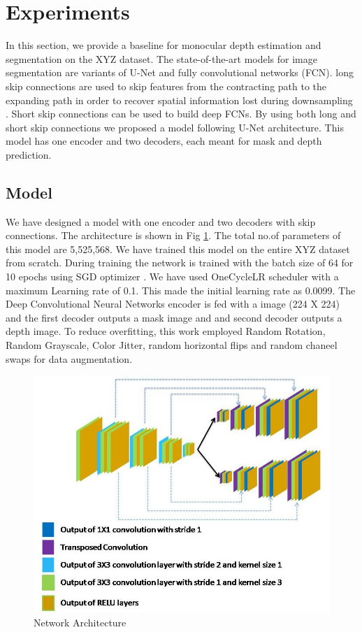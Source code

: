 \documentclass{article}
\begin{document}
\section{Experiments}
In this section, we provide a baseline for monocular depth estimation and segmentation on the XYZ dataset. 
The state-of-the-art models for image segmentation are variants of U-Net and fully convolutional networks (FCN)\cite{drozdzal2016importance}. 
long skip connections are used to skip features from the contracting path to the expanding path in order to recover 
spatial information lost during downsampling \cite{zhou2019unet++}. Short skip connections can be used to build deep FCNs. 
By using both long and short skip connections we proposed a model following U-Net architecture. 
This model has one encoder and two decoders, each meant for mask and depth prediction.
\subsection{Model}
We have designed a model with one encoder and two decoders with skip connections. 
The architecture is shown in Fig \ref{fig:modelarch}. The total no.of parameters of this model are 5,525,568. 
We have trained this model on the entire XYZ dataset from scratch. 
During training the network is trained with the batch size of 64 for 10 epochs using SGD optimizer \cite{bottou2010large}. 
We have used OneCycleLR scheduler \cite{smith2018disciplined} with a maximum Learning rate of 0.1. 
This made the initial learning rate as 0.0099.
The Deep Convolutional Neural Networks encoder is fed with a image (224 X 224) and the first decoder outputs a mask 
image and and second decoder outputs a depth image. To reduce overfitting\cite{perez2017effectiveness}, 
this work employed Random Rotation, Random Grayscale, Color Jitter, random horizontal flips and random chaneel swaps for data augmentation.

\begin{figure}[h!]
\centering
  \includegraphics[width=1\textwidth]{networkarchitecture.jpg}
  \caption{Network Architecture}
  \label{fig:modelarch}
\end{figure}
\end{document}
